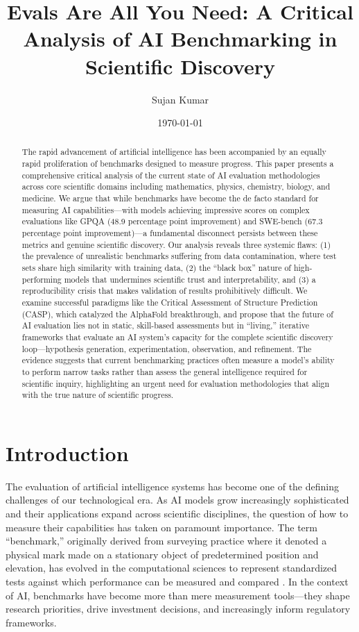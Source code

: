 \documentclass[10pt,twocolumn]{article}
\title{\Large \textbf{Evals Are All You Need: A Critical Analysis of AI Benchmarking in Scientific Discovery}}
\author[1]{Sujan Kumar}
\affil[1]{}
\date{\today}
\begin{document}
\maketitle

\begin{abstract}
The rapid advancement of artificial intelligence has been accompanied by an equally rapid proliferation of benchmarks designed to measure progress. This paper presents a comprehensive critical analysis of the current state of AI evaluation methodologies across core scientific domains including mathematics, physics, chemistry, biology, and medicine. We argue that while benchmarks have become the de facto standard for measuring AI capabilities—with models achieving impressive scores on complex evaluations like GPQA (48.9 percentage point improvement) and SWE-bench (67.3 percentage point improvement)—a fundamental disconnect persists between these metrics and genuine scientific discovery. Our analysis reveals three systemic flaws: (1) the prevalence of unrealistic benchmarks suffering from data contamination, where test sets share high similarity with training data, (2) the ``black box'' nature of high-performing models that undermines scientific trust and interpretability, and (3) a reproducibility crisis that makes validation of results prohibitively difficult. We examine successful paradigms like the Critical Assessment of Structure Prediction (CASP), which catalyzed the AlphaFold breakthrough, and propose that the future of AI evaluation lies not in static, skill-based assessments but in ``living,'' iterative frameworks that evaluate an AI system's capacity for the complete scientific discovery loop—hypothesis generation, experimentation, observation, and refinement. The evidence suggests that current benchmarking practices often measure a model's ability to perform narrow tasks rather than assess the general intelligence required for scientific inquiry, highlighting an urgent need for evaluation methodologies that align with the true nature of scientific progress.
\end{abstract}

\section{Introduction}

The evaluation of artificial intelligence systems has become one of the defining challenges of our technological era. As AI models grow increasingly sophisticated and their applications expand across scientific disciplines, the question of how to measure their capabilities has taken on paramount importance. The term ``benchmark,'' originally derived from surveying practice where it denoted a physical mark made on a stationary object of predetermined position and elevation, has evolved in the computational sciences to represent standardized tests against which performance can be measured and compared \cite{stanford2025}. In the context of AI, benchmarks have become more than mere measurement tools—they shape research priorities, drive investment decisions, and increasingly inform regulatory frameworks.
\end{document}
